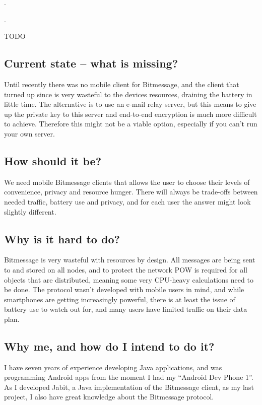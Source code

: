 \documentclass{bfh}
\begin{document}
  .

  .

  TODO


  \subsection{Current state -- what is missing?}
  Until recently there was no mobile client for Bitmessage, and the client that turned up since is very wasteful to the devices resources, draining the battery in little time. The alternative is to use an e-mail relay server, but this means to give up the private key to this server and end-to-end encryption is much more difficult to achieve. Therefore this might not be a viable option, especially if you can't run your own server.

  \subsection{How should it be?}
  We need mobile Bitmessage clients that allows the user to choose their levels of convenience, privacy and resource hunger. There will always be trade-offs between needed traffic, battery use and privacy, and for each user the answer might look slightly different.

  \subsection{Why is it hard to do?}
  Bitmessage is very wasteful with resources by design. All messages are being sent to and stored on all nodes, and to protect the network \ac{POW} is required for all objects that are distributed, meaning some very \acs{CPU}-heavy calculations need to be done. The protocol wasn't developed with mobile users in mind, and while smartphones are getting increasingly powerful, there is at least the issue of battery use to watch out for, and many users have limited traffic on their data plan.

  \subsection{Why me, and how do I intend to do it?}
  I have seven years of experience developing Java applications, and was programming Android apps from the moment I had my ``Android Dev Phone 1''. As I developed Jabit, a Java implementation of the Bitmessage client, as my last project, I also have great knowledge about the Bitmessage protocol.
\end{document}
